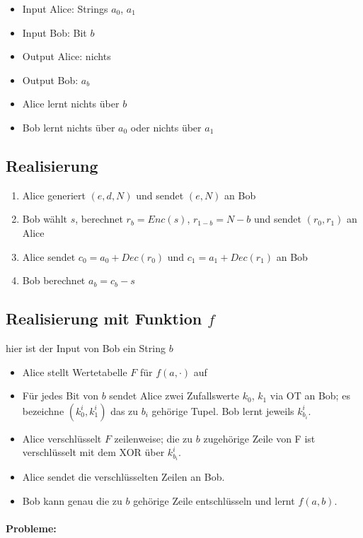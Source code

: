 \documentclass[a4paper,twoside,DIV15,BCOR12mm]{scrbook}
\begin{document}
\begin{itemize}
	\item Input Alice: Strings $a_0$, $a_1$
	\item Input Bob: Bit $b$
	\item Output Alice: nichts
	\item Output Bob: $a_b$
	\item Alice lernt nichts über $b$
	\item Bob lernt nichts über $a_0$ oder nichts über $a_1$
\end{itemize}

\subsection{Realisierung}

\begin{enumerate}
	\item Alice generiert $(e,d,N)$ und sendet $(e,N)$ an Bob
	\item Bob wählt $s$, berechnet $r_b = Enc(s)$, $r_{1-b} = N-b$ und sendet $(r_0, r_1)$ an Alice
	\item Alice sendet $c_0 = a_0 + Dec(r_0)$ und $c_1 = a_1 + Dec(r_1)$ an Bob
	\item Bob berechnet $a_b = c_b - s$
\end{enumerate}

\subsection{Realisierung mit Funktion $f$}

hier ist der Input von Bob ein String $b$

\begin{itemize}
	\item Alice stellt Wertetabelle $F$ für $f(a, \cdot)$ auf
	\item Für jedes Bit von $b$ sendet Alice zwei Zufallswerte $k_0$, $k_1$ via OT an Bob; es bezeichne $(k_0^i, k_1^i)$ das zu $b_i$ gehörige Tupel. Bob lernt jeweils $k_{b_i}^i$.
	\item Alice verschlüsselt $F$ zeilenweise; die zu $b$ zugehörige Zeile von F ist verschlüsselt mit dem XOR über $k_{b_i}^i$.
	\item Alice sendet die verschlüsselten Zeilen an Bob.
	\item Bob kann genau die zu $b$ gehörige Zeile entschlüsseln und lernt $f(a,b)$.
\end{itemize}

\paragraph{Probleme:}
\end{document}
